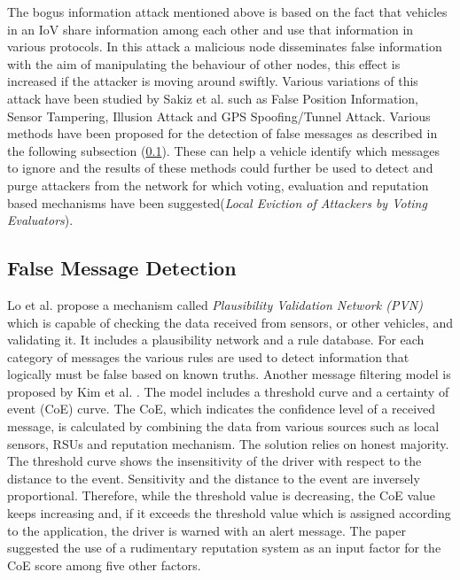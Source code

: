 \documentclass[journal]{IEEEtran}
\begin{document}
The bogus information attack mentioned above is based on the fact that vehicles in an IoV share information among each other and use that information in various protocols. In this attack a malicious node disseminates false information with the aim of manipulating the behaviour of other nodes, this effect is increased if the attacker is moving around swiftly\cite{c:MotorwayAttack}. Various variations of this attack have been studied by Sakiz et al.\cite{c:AttacksSurvey} such as False Position Information\cite{c:FalsePositionInformation}, Sensor Tampering, Illusion Attack\cite{c:IllusionAttack} and GPS Spoofing/Tunnel Attack\cite{c:TunnelAttack}. Various methods have been proposed for the detection of false messages as described in the following subsection (\ref{sec:RV:FalseMsgDetection}). These can help a vehicle identify which messages to ignore and the results of these methods could further be used to detect and purge attackers from the network for which voting, evaluation and reputation based mechanisms have been suggested\cite{c:MDSandLEAVE}(\textit{Local Eviction of Attackers by Voting Evaluators})\cite{c:messagefilterCoE}. 

\subsection{False Message Detection}
\label{sec:RV:FalseMsgDetection}
Lo et al. \cite{c:IllusionAttack} propose a mechanism called \textit{Plausibility Validation Network (PVN)} which is capable of checking the data received from sensors, or other vehicles, and validating it. It includes a plausibility network and a rule database. For each category of messages the various rules are used to detect information that logically must be false based on known truths.
Another  message filtering model is proposed by Kim et al. \cite{c:messagefilterCoE}. The model includes a threshold curve and a certainty of event (CoE) curve. The CoE, which indicates the confidence level of a received message, is calculated by combining the data from various sources such as local sensors, RSUs and reputation mechanism. The solution relies on honest majority. The threshold curve shows the insensitivity of the driver with respect to the distance to the event. Sensitivity and the distance to the event are inversely proportional. Therefore, while the threshold value is decreasing, the CoE value keeps increasing and, if it exceeds the threshold value which is assigned according to the application, the driver is warned with an alert message. The paper suggested the use of a rudimentary reputation system as an input factor for the CoE score among five other factors.
\end{document}
